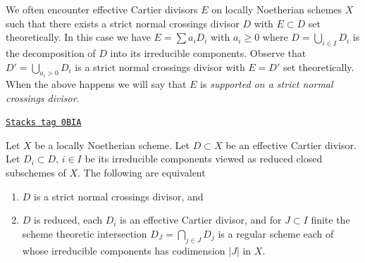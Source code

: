 We often encounter effective Cartier divisors $E$ on locally Noetherian
schemes $X$ such that there exists a strict normal crossings divisor $D$
with $E \subset D$ set theoretically.
In this case we have
$E = \sum a_i D_i$ with $a_i \geq 0$ where $D = \bigcup_{i \in I} D_i$
is the decomposition of $D$ into its irreducible components.
Observe that $D' = \bigcup_{a_i > 0} D_i$ is a strict normal crossings
divisor with $E = D'$ set theoretically.
When the above happens we will say that
$E$ is {\it supported on a strict normal crossings divisor}.

\begin{lemma}
\label{etale-lemma-strict-normal-crossings}
\href{https://stacks.math.columbia.edu/tag/0BIA}{\texttt{Stacks tag 0BIA}}

Let $X$ be a locally Noetherian scheme. Let $D \subset X$ be an
effective Cartier divisor. Let $D_i \subset D$, $i \in I$ be its
irreducible components viewed as reduced closed subschemes of $X$.
The following are equivalent
\begin{enumerate}
\item $D$ is a strict normal crossings divisor, and
\item $D$ is reduced, each $D_i$ is an effective Cartier divisor, and
for $J \subset I$ finite the scheme theoretic
intersection $D_J = \bigcap_{j \in J} D_j$ is a
regular scheme each of whose irreducible components has
codimension $|J|$ in $X$.
\end{enumerate}
\end{lemma}

